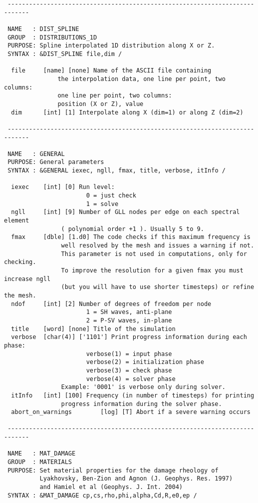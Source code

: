 \begin{verbatim}
 ----------------------------------------------------------------------------

 NAME   : DIST_SPLINE
 GROUP  : DISTRIBUTIONS_1D
 PURPOSE: Spline interpolated 1D distribution along X or Z.
 SYNTAX : &DIST_SPLINE file,dim /

  file     [name] [none] Name of the ASCII file containing
               the interpolation data, one line per point, two columns: 
               one line per point, two columns: 
               position (X or Z), value
  dim      [int] [1] Interpolate along X (dim=1) or along Z (dim=2)

 ----------------------------------------------------------------------------

 NAME   : GENERAL
 PURPOSE: General parameters
 SYNTAX : &GENERAL iexec, ngll, fmax, title, verbose, itInfo /

  iexec    [int] [0] Run level:
                       0 = just check
                       1 = solve
  ngll     [int] [9] Number of GLL nodes per edge on each spectral element
                ( polynomial order +1 ). Usually 5 to 9.
  fmax     [dble] [1.d0] The code checks if this maximum frequency is
                well resolved by the mesh and issues a warning if not. 
                This parameter is not used in computations, only for checking.
                To improve the resolution for a given fmax you must increase ngll 
                (but you will have to use shorter timesteps) or refine the mesh.
  ndof     [int] [2] Number of degrees of freedom per node
                       1 = SH waves, anti-plane
                       2 = P-SV waves, in-plane
  title    [word] [none] Title of the simulation
  verbose  [char(4)] ['1101'] Print progress information during each phase:
                       verbose(1) = input phase
                       verbose(2) = initialization phase
                       verbose(3) = check phase
                       verbose(4) = solver phase
                Example: '0001' is verbose only during solver.
  itInfo   [int] [100] Frequency (in number of timesteps) for printing
                progress information during the solver phase.
  abort_on_warnings        [log] [T] Abort if a severe warning occurs

 ----------------------------------------------------------------------------

 NAME   : MAT_DAMAGE
 GROUP  : MATERIALS
 PURPOSE: Set material properties for the damage rheology of 
          Lyakhovsky, Ben-Zion and Agnon (J. Geophys. Res. 1997) 
          and Hamiel et al (Geophys. J. Int. 2004)
 SYNTAX : &MAT_DAMAGE cp,cs,rho,phi,alpha,Cd,R,e0,ep /


\end{verbatim}

